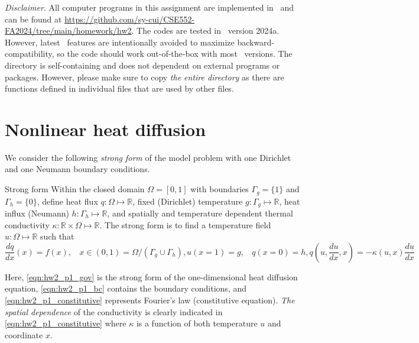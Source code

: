 \pagestyle{fancy}
\setlength{\headheight}{16pt}
\fancyhead{} %
\fancyfoot{} %
\fancyfoot[C]{\thepage}

\noindent \emph{Disclaimer}. All computer programs in this assignment are implemented in \matlab~and can be found at \url{https://github.com/sy-cui/CSE552-FA2024/tree/main/homework/hw2}. 
The codes are tested in \matlab~version 2024a. 
However, latest \matlab~features are intentionally avoided to maximize backward-compatibility, so the code should work out-of-the-box with most \matlab~versions. 
The directory is self-containing and does not dependent on external programs or packages. 
However, please make sure to copy \emph{the entire directory} as there are functions defined in individual files that are used by other files. 

\section{Nonlinear heat diffusion}
We consider the following \emph{strong form} of the model problem with one Dirichlet and one Neumann boundary conditions.
\begin{codenv}{Strong form}
    Within the closed domain $\Omega = [0, 1]$ with boundaries $\Gamma_g = \{1\}$ and $\Gamma_h = \{0\}$, define heat flux $q: \Omega \mapsto \mathbb{R}$, fixed (Dirichlet) temperature $g: \Gamma_g \mapsto \mathbb{R}$, heat influx (Neumann) $h: \Gamma_h \mapsto \mathbb{R}$, and spatially and temperature dependent thermal conductivity $\kappa: \mathbb{R}\times \Omega \mapsto \mathbb{R}$. 
    The strong form is to find a temperature field $u: \Omega \mapsto \mathbb{R}$ such that
    \begin{subequations}
        \begin{equation}\label{eqn:hw2_p1_gov}
            \frac{dq}{dx}(x) = f(x), ~~~~ x\in (0, 1) = \Omega / ( \Gamma_g\cup\Gamma_h ),
        \end{equation}
        \begin{equation}\label{eqn:hw2_p1_bc}
            u(x = 1) = g, ~~~~ q(x=0) = h,
        \end{equation}
        \begin{equation}\label{eqn:hw2_p1_constitutive}
            q\left(u, \frac{du}{dx}, x\right)  = -\kappa\left(u, x\right) \frac{du}{dx}
        \end{equation}
    \end{subequations}
\end{codenv}
Here, \cref{eqn:hw2_p1_gov} is the strong form of the one-dimensional heat diffusion equation, \cref{eqn:hw2_p1_bc} contains the boundary conditions, and \cref{eqn:hw2_p1_constitutive} represents Fourier's law (constitutive equation). 
\emph{The spatial dependence} of the conductivity is clearly indicated in \cref{eqn:hw2_p1_constitutive} where $\kappa$ is a function of both temperature $u$ and coordinate $x$.

